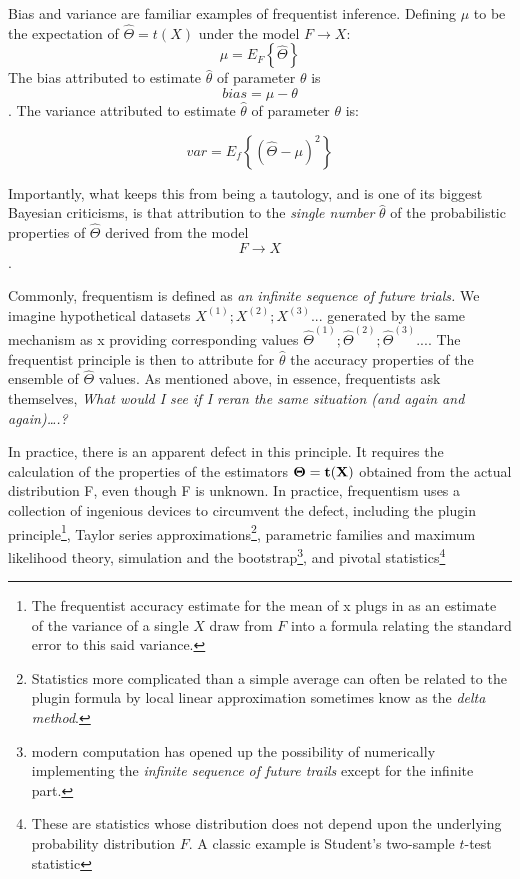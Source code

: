 \documentclass{article}
\begin{document}
Bias and variance are familiar examples of frequentist inference.
Defining \(\mu\) to be the expectation of \(\hat{\Theta}=t(X)\) under
the model \(F \to X\): \[\mu=E_F\left\{\hat{\Theta}\right\}\] The bias
attributed to estimate \(\hat{\theta}\) of parameter \(\theta\) is
\[bias=\mu - \theta\]. The variance attributed to estimate
\(\hat{\theta}\) of parameter \(\theta\) is:

\[var=E_f\left\{(\hat{\Theta}-\mu)^2\right\}\]

Importantly, what keeps this from being a tautology, and is one of its
biggest Bayesian criticisms, is that attribution to the \emph{single
number} \(\hat{\theta}\) of the probabilistic properties of
\(\hat{\Theta}\) derived from the model \[F \to X\].

Commonly, frequentism is defined as \emph{an infinite sequence of future
trials.} We imagine hypothetical datasets \(X^{(1)};X^{(2)};X^{(3)}...\)
generated by the same mechanism as x providing corresponding values
\(\hat{\Theta}^{(1)};\hat{\Theta}^{(2)};\hat{\Theta}^{(3)}...\). The
frequentist principle is then to attribute for \(\hat{\theta}\) the
accuracy properties of the ensemble of \(\hat{\Theta}\) values. As
mentioned above, in essence, frequentists ask themselves, \emph{What
would I see if I reran the same situation (and again and again)\ldots.?}

In practice, there is an apparent defect in this principle. It requires
the calculation of the properties of the estimators \(\bf{\Theta}=t(X)\)
obtained from the actual distribution F, even though F is unknown. In
practice, frequentism uses a collection of ingenious devices to
circumvent the defect, including the plugin principle\footnote{The
  frequentist accuracy estimate for the mean of x plugs in as an
  estimate of the variance of a single \(X\) draw from \(F\) into a
  formula relating the standard error to this said variance.}, Taylor
series approximations\footnote{Statistics more complicated than a simple
  average can often be related to the plugin formula by local linear
  approximation sometimes know as the \emph{delta method}.}, parametric
families and maximum likelihood theory, simulation and the
bootstrap\footnote{modern computation has opened up the possibility of
  numerically implementing the \emph{infinite sequence of future trails}
  except for the infinite part.}, and pivotal statistics\footnote{These
  are statistics whose distribution does not depend upon the underlying
  probability distribution \(F\). A classic example is Student's
  two-sample \(t\)-test statistic}
\end{document}
